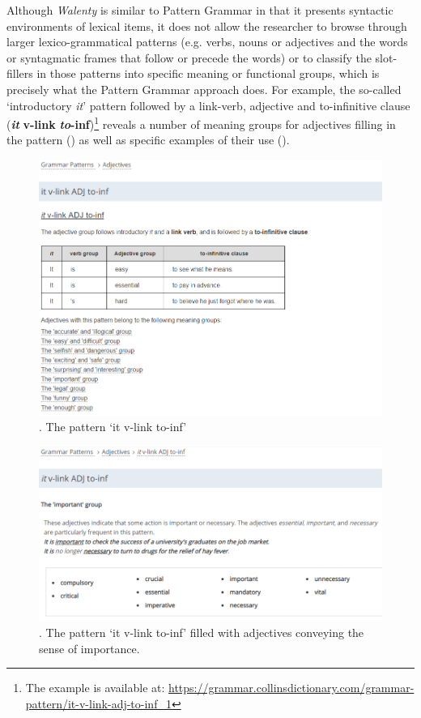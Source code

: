 \documentclass[output=paper]{langscibook}
\begin{document}
Although \textit{Walenty} is similar to Pattern Grammar in that it presents syntactic environments of lexical items, it does not allow the researcher to browse through larger lexico-grammatical patterns (e.g. verbs, nouns or adjectives and the words or syntagmatic frames that follow or precede the words) or to classify the slot-fillers in those patterns into specific meaning or functional groups, which is precisely what the Pattern Grammar approach does. For example, the so-called ‘introductory \textit{it}’ pattern followed by a link-verb, adjective and to-infinitive clause (\textbf{\textit{it}} \textbf{v-link} \textbf{{\ADJ}} \textbf{\textit{to}}\textbf{{}-inf})\footnote{The example is available at: \url{https://grammar.collinsdictionary.com/grammar-pattern/it-v-link-adj-to-inf_1}} reveals a number of meaning groups for adjectives filling in the pattern () as well as specific examples of their use ().

  
\begin{figure}
\includegraphics[width=\textwidth]{figures/grabowski-img002.png}
 \caption{\label{fig:grabowski:2}. The pattern ‘it v-link {\ADJ} to-inf’}
\end{figure}

\begin{figure}
\includegraphics[width=\textwidth]{figures/grabowski-img003.png}
 \caption{\label{fig:grabowski:3}. The pattern ‘it v-link {\ADJ} to-inf’ filled with adjectives conveying the sense of importance.}
 \end{figure}
\end{document}
